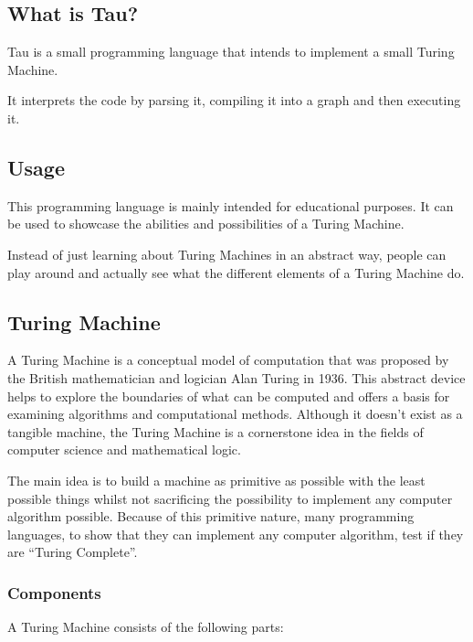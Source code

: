 \subsection{What is Tau?}
Tau is a small programming language that intends to implement a small Turing Machine.

It interprets the code by parsing it, compiling it into a graph and then executing it.

\subsection{Usage}
This programming language is mainly intended for educational purposes. 
It can be used to showcase the abilities and possibilities of a Turing Machine.

Instead of just learning about Turing Machines in an abstract way, 
people can play around and actually see what the different elements of a Turing Machine do.

\subsection{Turing Machine}
A Turing Machine is a conceptual model of computation that was proposed by the British mathematician and logician Alan Turing in 1936. 
This abstract device helps to explore the boundaries of what can be computed and offers a basis for examining algorithms and computational methods. 
Although it doesn't exist as a tangible machine, the Turing Machine is a cornerstone idea in the fields of computer science and mathematical logic.

The main idea is to build a machine as primitive as possible with the least possible things whilst not sacrificing the possibility
to implement any computer algorithm possible. Because of this primitive nature, many programming languages, to show that they can implement any
computer algorithm, test if they are ``Turing Complete''.

\subsubsection{Components}
A Turing Machine consists of the following parts:

